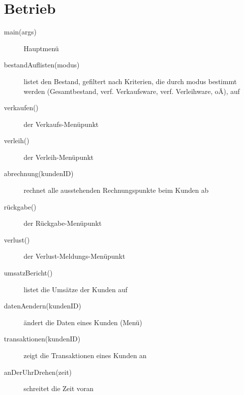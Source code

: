 \documentclass[a4paper,12pt,titlepage]{article}
\begin{document}
\section{Betrieb}
\begin{description}
\item[main(args)]
Hauptmenü
\item[bestandAuflisten(modus)]
listet den Bestand, gefiltert nach Kriterien, die durch modus bestimmt werden (Gesamtbestand, verf. Verkaufsware, verf. Verleihware, oÄ), auf
\item[verkaufen()]
der Verkaufs-Menüpunkt
\item[verleih()]
der Verleih-Menüpunkt
\item[abrechnung(kundenID)]
rechnet alle ausstehenden Rechnungspunkte beim Kunden ab
\item[rückgabe()]
der Rückgabe-Menüpunkt
\item[verlust()]
der Verlust-Meldungs-Menüpunkt
\item[umsatzBericht()]
listet die Umsätze der Kunden auf
\item[datenAendern(kundenID)]
ändert die Daten eines Kunden (Menü)
\item[transaktionen(kundenID)]
zeigt die Transaktionen eines Kunden an
\item[anDerUhrDrehen(zeit)]
schreitet die Zeit voran
\end{description}
\end{document}
